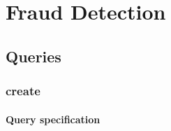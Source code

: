 \chapter{Fraud Detection}
\label{chp:fraud-detection}

\section{Queries}

\subsection{create}

\subsubsection*{Query specification}

